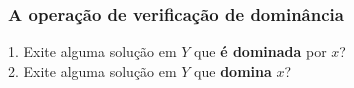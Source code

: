 \documentclass[10pt,xcolor=table,fleqn]{beamer}
\renewcommand{\emph}{\textbf}
\begin{document}
\begin{frame}
  \frametitle{A operação de verificação de dominância}
  1. Exite alguma solução em $Y$ que \emph{é dominada} por $x$?\\
  2. Exite alguma solução em $Y$ que \emph{domina} $x$?
  \begin{center}
  \end{center}
\end{frame}
\end{document}
